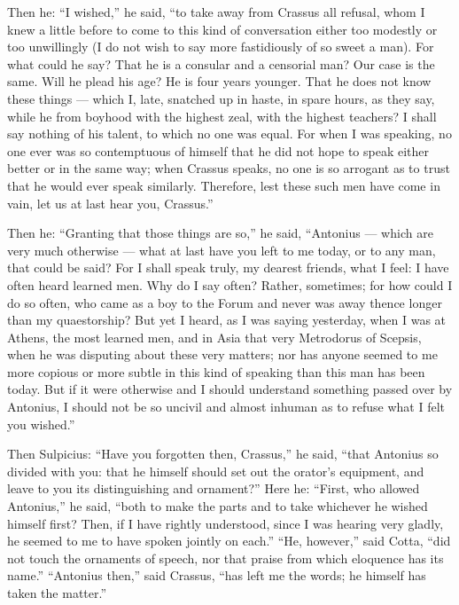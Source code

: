  Then he: ``I wished,'' he said, ``to take away from Crassus all refusal, whom I knew a little before to come to this kind of conversation either too modestly or too unwillingly (I do not wish to say more fastidiously of so sweet a man). For what could he say? That he is a consular and a censorial man? Our case is the same. Will he plead his age? He is four years younger. That he does not know these things — which I, late, snatched up in haste, in spare hours, as they say, while he from boyhood with the highest zeal, with the highest teachers? I shall say nothing of his talent, to which no one was equal. For when I was speaking, no one ever was so contemptuous of himself that he did not hope to speak either better or in the same way; when Crassus speaks, no one is so arrogant as to trust that he would ever speak similarly. Therefore, lest these such men have come in vain, let us at last hear you, Crassus.''

 Then he: ``Granting that those things are so,'' he said, ``Antonius — which are very much otherwise — what at last have you left to me today, or to any man, that could be said? For I shall speak truly, my dearest friends, what I feel: I have often heard learned men. Why do I say often? Rather, sometimes; for how could I do so often, who came as a boy to the Forum and never was away thence longer than my quaestorship? But yet I heard, as I was saying yesterday, when I was at Athens, the most learned men, and in Asia that very Metrodorus of Scepsis, when he was disputing about these very matters; nor has anyone seemed to me more copious or more subtle in this kind of speaking than this man has been today. But if it were otherwise and I should understand something passed over by Antonius, I should not be so uncivil and almost inhuman as to refuse what I felt you wished.''

 Then Sulpicius: ``Have you forgotten then, Crassus,'' he said, ``that Antonius so divided with you: that he himself should set out the orator's equipment, and leave to you its distinguishing and ornament?'' Here he: ``First, who allowed Antonius,'' he said, ``both to make the parts and to take whichever he wished himself first? Then, if I have rightly understood, since I was hearing very gladly, he seemed to me to have spoken jointly on each.'' ``He, however,'' said Cotta, ``did not touch the ornaments of speech, nor that praise from which eloquence has its name.'' ``Antonius then,'' said Crassus, ``has left me the words; he himself has taken the matter.''

